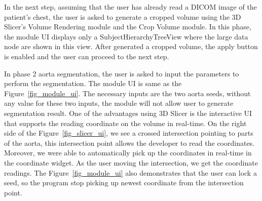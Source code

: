 In the next step, assuming that the user has already read a DICOM image of the patient's chest, the user is asked to generate a cropped volume using the 3D Slicer's Volume Rendering module and the Crop Volume module. In this phase, the module UI displays only a SubjectHierarchyTreeView where the large data node are shown in this view. After generated a cropped volume, the apply button is enabled and the user can proceed to the next step.

In phase 2 aorta segmentation, the user is asked to input the parameters to perform the segmentation. The module UI is same as the Figure~\ref{fig_module_ui}. The necessary inputs are the two aorta seeds, without any value for these two inputs, the module will not allow user to generate segmentation result. One of the advantages using 3D Slicer is the interactive UI that supports the reading coordinate on the volume in real-time. On the right side of the Figure~\ref{fig_slicer_ui}, we see a crossed intersection pointing to parts of the aorta, this intersection point allows the developer to read the coordinates. Moreover, we were able to automatically pick up the coordinates in real-time in the coordinate widget. As the user moving the intersection, we get the coordinate readings. The Figure~\ref{fig_module_ui} also demonstrates that the user can lock a seed, so the program stop picking up newest coordinate from the intersection point.

%





%


